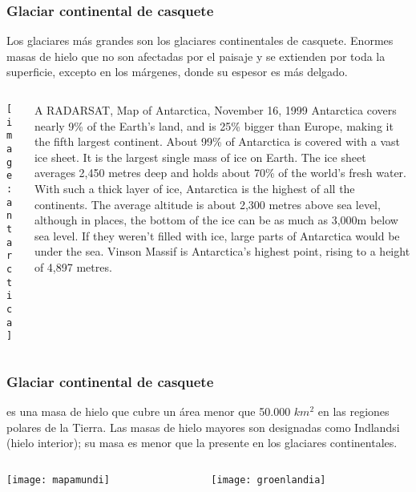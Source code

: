 \documentclass{beamer}
\begin{document}
\begin{frame}
\frametitle{Glaciar continental de casquete}
\justifying
\small{Los glaciares más grandes son los glaciares continentales de casquete. Enormes masas de hielo que no son afectadas por el paisaje y se extienden por toda la superficie, excepto en los márgenes, donde su espesor es más delgado.}
\begin{columns}
	\begin{column}{.65\linewidth}
	\begin{center}
	\texttt{[image: antarctica]}
	\end{center}
	\end{column}
	\begin{column}{.35\linewidth}
	\begin{center}
\tiny{A RADARSAT, Map of Antarctica, November 16, 1999 
Antarctica covers nearly 9\% of the Earth’s land, and is 25\% bigger than Europe, making it the fifth largest continent. About 99\% of Antarctica is covered with a vast ice sheet. It is the largest single mass of ice on Earth. The ice sheet averages 2,450 metres deep and holds about 70\% of the world’s fresh water. With such a thick layer of ice, Antarctica is the highest of all the continents. The average altitude is about 2,300 metres above sea level, although in places, the bottom of the ice can be as much as 3,000m below sea level. If they weren’t filled with ice, large parts of Antarctica would be under the sea. Vinson Massif is Antarctica’s highest point, rising to a height of 4,897 metres.}
	\end{center}
	\end{column}
\end{columns}
\end{frame}
\begin{frame}
\frametitle{Glaciar continental de casquete}
\justifying
\small{es una masa de hielo que cubre un área menor que 50.000 $km^2$ en las regiones polares de la Tierra. Las masas de hielo mayores son designadas como Indlandsi (hielo interior); su masa es menor que la presente en los glaciares continentales.}
\begin{columns}
	\begin{column}{.2\linewidth}
	\begin{center}
	\texttt{[image: mapamundi]}
	\end{center}
	\end{column}
	\begin{column}{.8\linewidth}
	\begin{center}
	\texttt{[image: groenlandia]}
	\end{center}
	\end{column}
\end{columns}
\end{frame}
\end{document}
